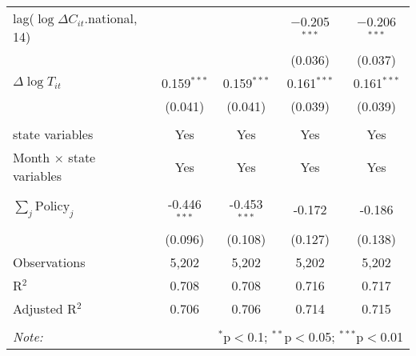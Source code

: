 \begin{tabular}{@{\extracolsep{1pt}}lcccc}
  lag($\log \Delta C_{it}$.national, 14) &  &  & $-$0.205$^{***}$ & $-$0.206$^{***}$ \\ 
  &  &  & (0.036) & (0.037) \\ 
  $\Delta \log T_{it}$ & 0.159$^{***}$ & 0.159$^{***}$ & 0.161$^{***}$ & 0.161$^{***}$ \\ 
  & (0.041) & (0.041) & (0.039) & (0.039) \\ 
 \hline \\[-1.8ex] 
state variables & Yes & Yes & Yes & Yes \\ 
Month $\times$ state variables & Yes & Yes & Yes & Yes \\ 
\hline \\[-1.8ex] 
$\sum_j \mathrm{Policy}_j$ & -0.446$^{***}$ & -0.453$^{***}$ & -0.172 & -0.186 \\ 
 & (0.096) & (0.108) & (0.127) & (0.138) \\ 
Observations & 5,202 & 5,202 & 5,202 & 5,202 \\ 
R$^{2}$ & 0.708 & 0.708 & 0.716 & 0.717 \\ 
Adjusted R$^{2}$ & 0.706 & 0.706 & 0.714 & 0.715 \\ 
\hline 
\hline \\[-1.8ex] 
\textit{Note:}  & \multicolumn{4}{r}{$^{*}$p$<$0.1; $^{**}$p$<$0.05; $^{***}$p$<$0.01} \\ 
\end{tabular} 
